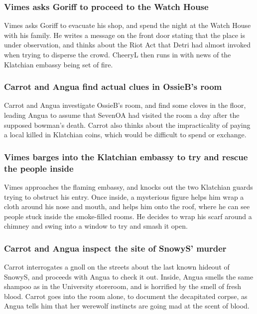 \subsubsection{\Gls{Vimes} asks \Gls{Goriff} to proceed to the Watch House}
\Gls{Vimes} asks \Gls{Goriff} to evacuate his shop, and spend the night at the Watch House with
his family. He writes a message on the front door stating that the place is under observation, and
thinks about the Riot Act that \Gls{Detri} had almost invoked when trying to disperse the crowd.
\Gls{CheeryL} then runs in with news of the Klatchian embassy being set of fire.

\subsubsection{\Gls{Carrot} and \Gls{Angua} find actual clues in \Gls{OssieB}'s room}
\Gls{Carrot} and \Gls{Angua} investigate \Gls{OssieB}'s room, and find some cloves in the floor,
leading \Gls{Angua} to assume that \Gls{SevenOA} had visited the room a day after the supposed
bowman's death. \Gls{Carrot} also thinks about the impracticality of paying a local killed in
Klatchian coins, which would be difficult to spend or exchange.

\subsubsection{\Gls{Vimes} barges into the Klatchian embassy to try and rescue the people inside}
\Gls{Vimes} approaches the flaming embassy, and knocks out the two Klatchian guards trying to
obstruct his entry. Once inside, a mysterious figure helps him wrap a cloth around his nose and
mouth, and helps him onto the roof, where he can see people stuck inside the smoke-filled rooms.
He decides to wrap his scarf around a chimney and swing into a window to try and smash it open.

\subsubsection{\Gls{Carrot} and \Gls{Angua} inspect the site of \Gls{SnowyS}' murder}
\Gls{Carrot} interrogates a gnoll on the streets about the last known hideout of \Gls{SnowyS}, and
proceeds with \Gls{Angua} to check it out. Inside, \Gls{Angua} smells the same shampoo as in the
University storeroom, and is horrified by the smell of fresh blood. \Gls{Carrot} goes into the
room alone, to document the decapitated corpse, as \Gls{Angua} tells him that her werewolf instincts
are going mad at the scent of blood.


